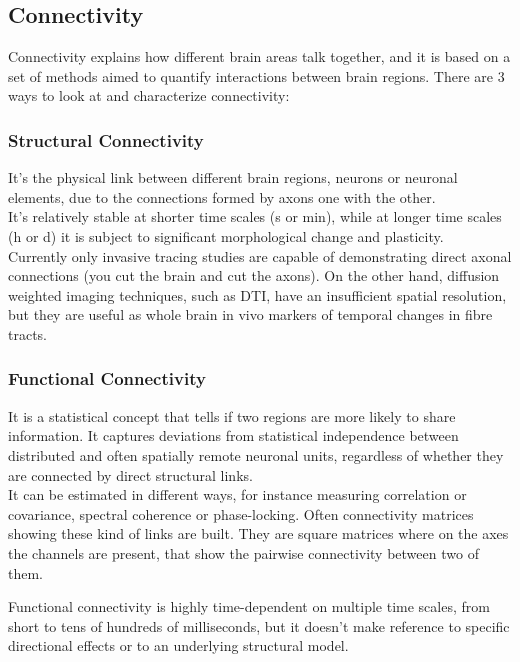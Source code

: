 \subsection{Connectivity}
Connectivity explains how different brain areas talk together, and it is based on a set of methods aimed to quantify interactions between brain regions. 
There are 3 ways to look at and characterize connectivity:
\subsubsection{Structural Connectivity}
\begin{figure}[H]
    \centering
    \subfigure[]{\texttt{[image: 13\_5]}} 
    \subfigure[]{\texttt{[image: 13\_8]}}
\end{figure}
It's the physical link between different brain regions, neurons or neuronal elements, due to the connections formed by axons one with the other.\\ 
It's relatively stable at shorter time scales (s or min), while at longer time scales (h or d) it is subject to significant morphological change and plasticity.\\
Currently only invasive tracing studies are capable of demonstrating direct axonal connections (you cut the brain and cut the axons). On the other hand, diffusion weighted imaging techniques, such as DTI, have an insufficient spatial resolution, but they are useful as whole brain in vivo markers of temporal changes in fibre tracts.
\subsubsection{Functional Connectivity}
It is a statistical concept that tells if two regions are more likely to share information. It captures deviations from statistical independence between distributed and often spatially remote neuronal units, regardless of whether they are connected by direct structural links.\\ 
It can be estimated in different ways, for instance measuring correlation or covariance, spectral coherence or phase-locking. Often connectivity matrices showing these kind of links are built. They are square matrices where on the axes the channels are present, that show the pairwise connectivity between two of them.
\begin{figure}[H]
    \centering
     \subfigure[]{\texttt{[image: 13\_6]}} 
    \subfigure[]{\texttt{[image: 13\_9]}}
\end{figure}
Functional connectivity is highly time-dependent on multiple time scales, from short to tens of hundreds of milliseconds, but it doesn't make reference to specific directional effects or to an underlying structural model.

